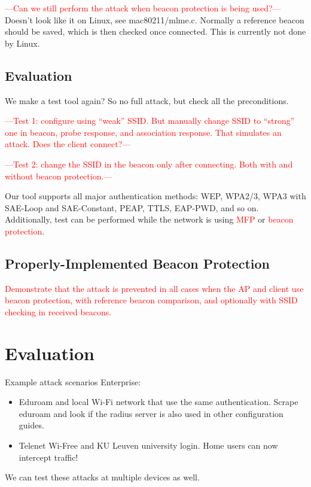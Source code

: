 \documentclass[sigconf,review]{acmart}
\newcommand{\wifi}{\mbox{Wi-Fi}}
\DeclareRobustCommand{\red}[1]{\textcolor{red}{#1}}
\begin{document}
\red{---Can we still perform the attack when beacon protection is being used?---}
Doesn't look like it on Linux, see mac80211/mlme.c.
Normally a reference beacon should be saved, which is then checked once connected.
This is currently not done by Linux.

\subsection{Evaluation}

We make a test tool again? So no full attack, but check all the preconditions.

\red{---Test 1: configure using ``weak'' SSID. But manually change SSID to ``strong'' one in beacon, probe response, and association response. That simulates an attack. Does the client connect?---}

\red{---Test 2: change the SSID in the beacon only after connecting. Both with and without beacon protection.---}

Our tool supports all major authentication methods: WEP, WPA2/3, WPA3 with SAE-Loop and SAE-Constant, PEAP, TTLS, EAP-PWD, and so on.
Additionally, test can be performed while the network is using \red{MFP} or \red{beacon protection}.

\subsection{Properly-Implemented Beacon Protection}

\red{Demonstrate that the attack is prevented in all cases when the AP and client use beacon protection, with reference beacon comparison, and optionally with SSID checking in received beacons.}

\section{Evaluation}
\label{sec:evaluation}

Example attack scenarios Enterprise:
\begin{itemize}
	\item Eduroam and local \wifi{} network that use the same authentication.
	Scrape eduroam and look if the radius server is also used in other configuration guides.
	\item Telenet Wi-Free and KU Leuven university login.
	Home users can now intercept traffic!
\end{itemize}

We can test these attacks at multiple devices as well.
\end{document}
